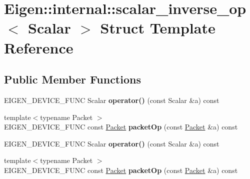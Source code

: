 \hypertarget{struct_eigen_1_1internal_1_1scalar__inverse__op}{}\section{Eigen\+:\+:internal\+:\+:scalar\+\_\+inverse\+\_\+op$<$ Scalar $>$ Struct Template Reference}
\label{struct_eigen_1_1internal_1_1scalar__inverse__op}
\subsection*{Public Member Functions}
\begin{DoxyCompactItemize}
\item 
\mbox{\label{struct_eigen_1_1internal_1_1scalar__inverse__op_ac925a565dfb99c882cb2986423017355}} 
E\+I\+G\+E\+N\+\_\+\+D\+E\+V\+I\+C\+E\+\_\+\+F\+U\+NC Scalar {\bfseries operator()} (const Scalar \&a) const
\item 
\mbox{\label{struct_eigen_1_1internal_1_1scalar__inverse__op_ab7ebbcf96eee400820c795f4a3e9dd74}} 
{\footnotesize template$<$typename Packet $>$ }\\E\+I\+G\+E\+N\+\_\+\+D\+E\+V\+I\+C\+E\+\_\+\+F\+U\+NC const \hyperlink{union_eigen_1_1internal_1_1_packet}{Packet} {\bfseries packet\+Op} (const \hyperlink{union_eigen_1_1internal_1_1_packet}{Packet} \&a) const
\item 
\mbox{\label{struct_eigen_1_1internal_1_1scalar__inverse__op_ac925a565dfb99c882cb2986423017355}} 
E\+I\+G\+E\+N\+\_\+\+D\+E\+V\+I\+C\+E\+\_\+\+F\+U\+NC Scalar {\bfseries operator()} (const Scalar \&a) const
\item 
\mbox{\label{struct_eigen_1_1internal_1_1scalar__inverse__op_ab7ebbcf96eee400820c795f4a3e9dd74}} 
{\footnotesize template$<$typename Packet $>$ }\\E\+I\+G\+E\+N\+\_\+\+D\+E\+V\+I\+C\+E\+\_\+\+F\+U\+NC const \hyperlink{union_eigen_1_1internal_1_1_packet}{Packet} {\bfseries packet\+Op} (const \hyperlink{union_eigen_1_1internal_1_1_packet}{Packet} \&a) const
\end{DoxyCompactItemize}


